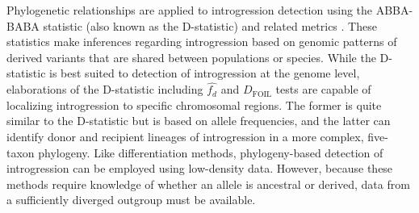 \documentclass[11pt]{article}
\begin{document}
Phylogenetic relationships are applied to introgression detection using the ABBA-BABA statistic (also known as the D-statistic) and related metrics \citep{durand2011}.
These statistics make inferences regarding introgression based on genomic patterns of derived variants that are shared between populations or species.
While the D-statistic is best suited to detection of introgression at the genome level, elaborations of the D-statistic including $\hat{f_{d}}$ \citep{martin2015} and $D_{\textrm{FOIL}}$ tests \citep{pease2015} are capable of localizing introgression to specific chromosomal regions.
The former is quite similar to the D-statistic but is based on allele frequencies, and the latter can identify donor and recipient lineages of introgression in a more complex, five-taxon phylogeny.
Like differentiation methods, phylogeny-based detection of introgression can be employed using low-density data.
However, because these methods require knowledge of whether an allele is ancestral or derived, data from a sufficiently diverged outgroup must be available.
\end{document}
